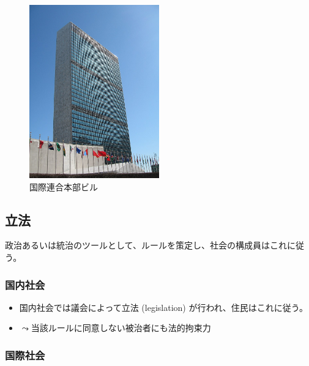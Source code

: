\documentclass[
  xelatex,
  ja=standard]{bxjsarticle}
\providecommand{\tightlist}{%
  \setlength{\itemsep}{0pt}\setlength{\parskip}{0pt}}\usepackage{longtable,booktabs,array}
\begin{document}
\begin{figure}[htpb]

{\centering \includegraphics[width=0.5\textwidth,height=\textheight]{international_society_files/mediabag/800px-UNHQ_NYC.jpg}

}

\caption{国際連合本部ビル}

\end{figure}

\hypertarget{ux7acbux6cd5}{%
\subsection{立法}\label{ux7acbux6cd5}}

政治あるいは統治のツールとして、ルールを策定し、社会の構成員はこれに従う。

\hypertarget{ux56fdux5185ux793eux4f1a}{%
\subsubsection{国内社会}\label{ux56fdux5185ux793eux4f1a}}

\begin{itemize}
\tightlist
\item
  国内社会では議会によって立法 (legislation)
  が行われ、住民はこれに従う。
\item
  \(\leadsto\)当該ルールに同意しない被治者にも法的拘束力
\end{itemize}

\hypertarget{ux56fdux969bux793eux4f1a}{%
\subsubsection{国際社会}\label{ux56fdux969bux793eux4f1a}}
\end{document}
